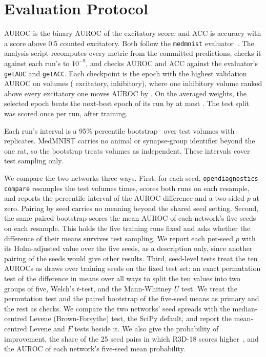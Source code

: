 \documentclass[conference]{IEEEtran}
\newif\ifanycitation
\let\citeAnyKey\cite
\renewcommand{\cite}{\global\anycitationtrue\citeAnyKey}
\begin{document}
\section{Evaluation Protocol}
\label{sec:protocol}

AUROC is the binary AUROC of the excitatory score, and ACC is accuracy with a score above
0.5 counted excitatory. Both follow the \texttt{medmnist} evaluator~\cite{medmnist2024evaluator}.
The analysis script recomputes every metric from the committed predictions, checks it
against each run's  to $10^{-9}$, and checks AUROC and ACC against the
evaluator's \texttt{getAUC} and \texttt{getACC}. Each checkpoint is the epoch with the
highest validation AUROC on \nVal{} volumes (\nValExc{} excitatory, \nValInh{} inhibitory),
where one inhibitory volume ranked above every excitatory one moves AUROC by
\valStep{}. On the averaged weights, the selected epoch beats the next-best epoch of its run
by at most \maxSelectionMargin{}. The test split was
scored once per run, after training.

Each run's interval is a 95\% percentile bootstrap~\cite{efron1979bootstrap} over test
volumes with \bootReps{} replicates. MedMNIST carries no animal or synapse-group identifier
beyond the one rat, so the bootstrap treats volumes as independent. These intervals cover
test sampling only.

We compare the two networks three ways. First, for each seed, \texttt{opendiagnostics
compare} resamples the test volumes \replicates{} times, scores both runs on each resample,
and reports the percentile interval of the AUROC difference and a two-sided $p$ at zero.
Pairing by seed carries no meaning beyond the shared seed setting. Second, the same paired
bootstrap scores the mean AUROC of each network's five seeds on each resample. This holds
the five training runs fixed and asks whether the difference of their means survives test
sampling. We report each per-seed $p$ with its Holm-adjusted value over the five
seeds, as a description only, since another pairing of the seeds would give other results. Third, seed-level tests treat the ten AUROCs as draws over training seeds on the
fixed test set: an exact permutation test of the difference in means over all
\permCount{} ways to split the ten values into two groups of five, Welch's $t$-test, and the
Mann-Whitney $U$ test. We treat the permutation test and the paired bootstrap of the
five-seed means as primary and the rest as checks. We compare the two networks' seed spreads with the median-centred Levene (Brown-Forsythe)
test, the SciPy default, and report the mean-centred Levene and $F$ tests beside it. We also
give the probability of improvement, the share of the 25 seed pairs in which R3D-18 scores
higher~\cite{bouthillier2021variance}, and the AUROC of each network's five-seed mean
probability.
\end{document}
